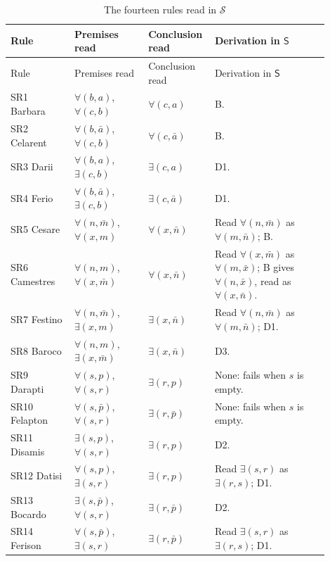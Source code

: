 \begin{longtable}{@{}>{\raggedright\arraybackslash}p{0.19\linewidth}>{\raggedright\arraybackslash}p{0.22\linewidth}>{\raggedright\arraybackslash}p{0.15\linewidth}>{\raggedright\arraybackslash}p{0.34\linewidth}@{}}
\caption{The fourteen rules read in \(\mathcal S\)}
\label{tab:p02-w02-p02-002-fourteen}\\
\hline
Rule & Premises read & Conclusion read & Derivation in \(\mathsf S\) \\
\hline
\endfirsthead
\hline
Rule & Premises read & Conclusion read & Derivation in \(\mathsf S\) \\
\hline
\endhead
SR1 Barbara & \(\forall(b,a)\), \(\forall(c,b)\) & \(\forall(c,a)\) & B. \\
SR2 Celarent & \(\forall(b,\bar a)\), \(\forall(c,b)\) & \(\forall(c,\bar a)\) & B. \\
SR3 Darii & \(\forall(b,a)\), \(\exists(c,b)\) & \(\exists(c,a)\) & D1. \\
SR4 Ferio & \(\forall(b,\bar a)\), \(\exists(c,b)\) & \(\exists(c,\bar a)\) & D1. \\
SR5 Cesare & \(\forall(n,\bar m)\), \(\forall(x,m)\) & \(\forall(x,\bar n)\) & Read \(\forall(n,\bar m)\) as \(\forall(m,\bar n)\); B. \\
SR6 Camestres & \(\forall(n,m)\), \(\forall(x,\bar m)\) & \(\forall(x,\bar n)\) & Read \(\forall(x,\bar m)\) as \(\forall(m,\bar x)\); B gives \(\forall(n,\bar x)\), read as \(\forall(x,\bar n)\). \\
SR7 Festino & \(\forall(n,\bar m)\), \(\exists(x,m)\) & \(\exists(x,\bar n)\) & Read \(\forall(n,\bar m)\) as \(\forall(m,\bar n)\); D1. \\
SR8 Baroco & \(\forall(n,m)\), \(\exists(x,\bar m)\) & \(\exists(x,\bar n)\) & D3. \\
SR9 Darapti & \(\forall(s,p)\), \(\forall(s,r)\) & \(\exists(r,p)\) & None: fails when \(s\) is empty. \\
SR10 Felapton & \(\forall(s,\bar p)\), \(\forall(s,r)\) & \(\exists(r,\bar p)\) & None: fails when \(s\) is empty. \\
SR11 Disamis & \(\exists(s,p)\), \(\forall(s,r)\) & \(\exists(r,p)\) & D2. \\
SR12 Datisi & \(\forall(s,p)\), \(\exists(s,r)\) & \(\exists(r,p)\) & Read \(\exists(s,r)\) as \(\exists(r,s)\); D1. \\
SR13 Bocardo & \(\exists(s,\bar p)\), \(\forall(s,r)\) & \(\exists(r,\bar p)\) & D2. \\
SR14 Ferison & \(\forall(s,\bar p)\), \(\exists(s,r)\) & \(\exists(r,\bar p)\) & Read \(\exists(s,r)\) as \(\exists(r,s)\); D1. \\
\hline
\end{longtable}

